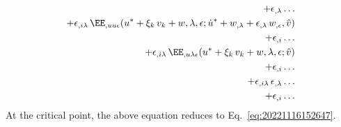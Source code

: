 \begin{equation}
\begin{aligned}[b]
    + \epsilon_{,\lambda} \ldots &\\
    + \epsilon_{,i\lambda} \, \EE_{,uu\epsilon}(u^\ast + \xi_k \, v_k + w, \lambda, \epsilon; \dot{u}^\ast + w_{,\lambda} + \epsilon_{,\lambda} \, w_{,\epsilon}, \hat{v}) &\\
    + \epsilon_{,i} \ldots &\\
    + \epsilon_{,i\lambda} \, \EE_{,u\lambda\epsilon}(u^\ast + \xi_k \, v_k + w, \lambda, \epsilon; \hat{v}) &\\
    + \epsilon_{,i} \ldots &\\
    + \epsilon_{,i\lambda} \, \epsilon_{,\lambda} \ldots &\\
    + \epsilon_{,i} \ldots
  \end{aligned}
\end{equation}
At the critical point, the above equation reduces to Eq.~\eqref{eq:20221116152647}.

